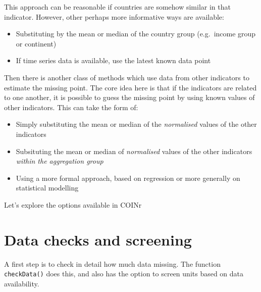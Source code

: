 \documentclass[
]{book}
\providecommand{\tightlist}{%
  \setlength{\itemsep}{0pt}\setlength{\parskip}{0pt}}
\begin{document}
This approach can be reasonable if countries are somehow similar in that indicator. However, other perhaps more informative ways are available:

\begin{itemize}
\tightlist
\item
  Substituting by the mean or median of the country group (e.g.~income group or continent)
\item
  If time series data is available, use the latest known data point
\end{itemize}

Then there is another class of methods which use data from other indicators to estimate the missing point. The core idea here is that if the indicators are related to one another, it is possible to guess the missing point by using known values of other indicators. This can take the form of:

\begin{itemize}
\tightlist
\item
  Simply substituting the mean or median of the \emph{normalised} values of the other indicators
\item
  Subsituting the mean or median of \emph{normalised} values of the other indicators \emph{within the aggregation group}
\item
  Using a more formal approach, based on regression or more generally on statistical modelling
\end{itemize}

Let's explore the options available in COINr

\hypertarget{data-checks-and-screening}{%
\section{Data checks and screening}\label{data-checks-and-screening}}

A first step is to check in detail how much data missing. The function \texttt{checkData()} does this, and also has the option to screen units based on data availability.
\end{document}
